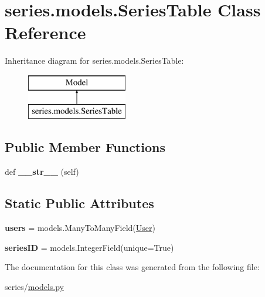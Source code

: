 \hypertarget{classseries_1_1models_1_1_series_table}{}\section{series.\+models.\+Series\+Table Class Reference}
\label{classseries_1_1models_1_1_series_table}
Inheritance diagram for series.\+models.\+Series\+Table\+:\begin{figure}[H]
\begin{center}
\leavevmode
\includegraphics[height=2.000000cm]{classseries_1_1models_1_1_series_table}
\end{center}
\end{figure}
\subsection*{Public Member Functions}
\begin{DoxyCompactItemize}
\item 
\mbox{\label{classseries_1_1models_1_1_series_table_a048fe7dc6394db71fd3f0966a4949758}} 
def {\bfseries \+\_\+\+\_\+str\+\_\+\+\_\+} (self)
\end{DoxyCompactItemize}
\subsection*{Static Public Attributes}
\begin{DoxyCompactItemize}
\item 
\mbox{\label{classseries_1_1models_1_1_series_table_ac06b02fdd88a953c7fbfc25fc834ab0c}} 
{\bfseries users} = models.\+Many\+To\+Many\+Field(\mbox{\hyperlink{classseries_1_1models_1_1_user}{User}})
\item 
\mbox{\label{classseries_1_1models_1_1_series_table_ae54b1810609a4f2f620f41ca12bfb915}} 
{\bfseries series\+ID} = models.\+Integer\+Field(unique=True)
\end{DoxyCompactItemize}


The documentation for this class was generated from the following file\+:\begin{DoxyCompactItemize}
\item 
series/\mbox{\hyperlink{models_8py}{models.\+py}}\end{DoxyCompactItemize}
